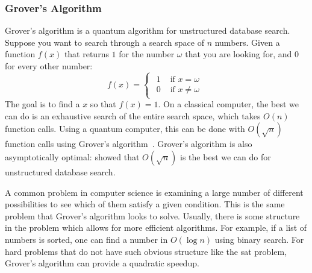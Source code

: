 \subsubsection{Grover's Algorithm}
Grover's algorithm is a quantum algorithm for unstructured database search.
Suppose you want to search through a search space of $n$ numbers.
Given a function $f(x)$ that returns $1$ for the number $\omega$ that you are looking for, and $0$ for every other number:
\begin{equation} \label{eqn:black-box-fn}
f(x) =
\begin{cases}
\begin{aligned}
1 & \text{ if } x = \omega \\
0 & \text{ if } x \neq \omega
\end{aligned}
\end{cases}
\end{equation}
The goal is to find a $x$ so that $f(x) = 1$.
On a classical computer, the best we can do is an exhaustive search of the entire search space, which takes $O(n)$ function calls.
Using a quantum computer, this can be done with $O(\sqrt{n})$ function calls using Grover's algorithm~\cite{grover1996fast}.
Grover's algorithm is also asymptotically optimal: \textcite{zalka1999grover} showed that $O(\sqrt{n})$ is the best we can do for unstructured database search.

A common problem in computer science is examining a large number of different possibilities to see which of them satisfy a given condition.
This is the same problem that Grover's algorithm looks to solve.
Usually, there is some structure in the problem which allows for more efficient algorithms.
For example, if a list of numbers is sorted, one can find a number in $O(\log n)$ using binary search.
For hard problems that do not have such obvious structure like the \gls{sat} problem, Grover's algorithm can provide a quadratic speedup.


